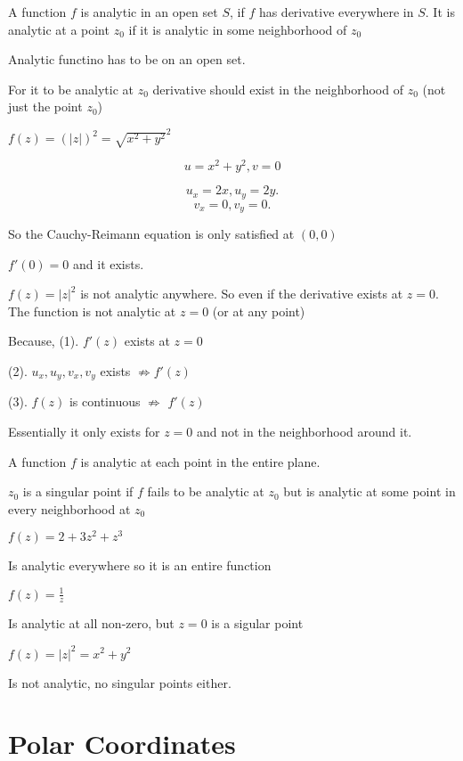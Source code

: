 \begin{definition}
   A function $f$ is analytic in an open set $S$, if $f$ has derivative everywhere in $S$. It is analytic at a point $z_0$ if it is analytic in some neighborhood of $z_0$
\end{definition}
\begin{remark}
   Analytic functino has to be on an open set.
\end{remark}
\begin{remark}
   For it to be analytic at $z_0$ derivative should exist in the neighborhood of $z_0$ (not just the point $z_0$)
\end{remark}


\begin{eg}
   $f(z) = (|z|)^2 = \sqrt{x^2+y^2}^2 $

   $$u = x^2 + y^2,v = 0$$

   \[
   u_x = 2x, u_y = 2y
   .\] 
   \[
   v_x = 0, v_y = 0
   .\] 

   So the Cauchy-Reimann equation is only satisfied at $(0,0)$

   $f'(0) = 0$ and it exists.
\end{eg}


\begin{remark}
   $f(z)= |z|^2$ is not analytic anywhere. So even if the derivative exists at $z = 0$. The function is not analytic at $z = 0$ (or at any point)

   Because, 
   (1).  $f'(z)$ exists at $z = 0$ 

   (2). $u_x,u_y,v_x,v_y$ exists  $\not \Rightarrow f'(z)$ 

   (3). $f(z)$ is continuous $\not \Rightarrow$  $f'(z)$ 

   Essentially it only exists for $z = 0$ and not in the neighborhood around it.
\end{remark}


\begin{definition}
   A function $f$ is analytic at each point in the entire plane. 
\end{definition}

\begin{definition}
   $z_0$ is a singular point if $f$ fails to be analytic at $z_0$ but is analytic at some point in every neighborhood at $z_0$
\end{definition}
\begin{eg}
   $f(z) = 2 + 3z^2 + z^3$

   Is analytic everywhere so it is an entire function
\end{eg}
\begin{eg}
   $f(z) = \frac{1}{z}$

   Is analytic at all non-zero, but $z = 0$ is a sigular point
\end{eg}
\begin{eg}
  $f(z) = |z|^2 = x^2 + y^2$

  Is not analytic, no singular points either.
\end{eg}


\section*{Polar Coordinates}










